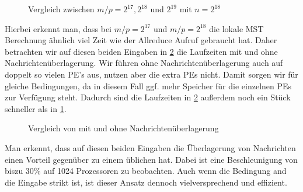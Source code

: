 \begin{figure}[H]
    \centering
    
    
    
    \caption{Vergleich zwischen $m/p= 2^{17},  2^{18}$ und $2^{19}$ mit $n=2^{18}$}
    \label{X-Img}
\end{figure}

Hierbei erkennt man, dass bei $m/p=2^{17}$ und $m/p=2^{18}$ die lokale MST Berechnung ähnlich viel Zeit wie der Allreduce Aufruf gebraucht hat. Daher betrachten wir auf diesen beiden Eingaben in \cref{Overlap-Img} die Laufzeiten \boruvkaAllreduce mit und ohne Nachrichtenüberlagerung. Wir führen \boruvkaAllreduce ohne Nachrichtenüberlagerung auch auf doppelt so vielen PE's aus, nutzen aber die extra PEs nicht. 
Damit sorgen wir für gleiche Bedingungen, da in diesem Fall ggf. mehr Speicher für die einzelnen PEs zur Verfügung steht. Dadurch sind die Laufzeiten in \cref{Overlap-Img} außerdem noch ein Stück schneller als in \cref{X-Img}.

\begin{figure}[H]
    \centering
    
     
    \caption{Vergleich von \boruvkaAllreduce mit und ohne Nachrichtenüberlagerung}
    \label{Overlap-Img}
\end{figure}

Man erkennt, dass auf diesen beiden Eingaben die Überlagerung von Nachrichten einen Vorteil gegenüber zu einem üblichen \boruvkaAllreduce hat. Dabei ist eine Beschleunigung von biszu 30\% auf 1024 Prozessoren zu beobachten. Auch wenn die Bedingung and die Eingabe strikt ist, ist dieser Ansatz dennoch vielversprechend und effizient.\\ 

